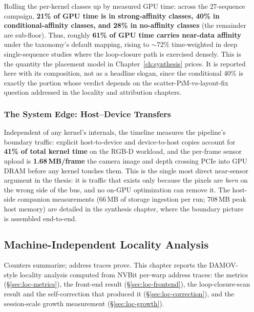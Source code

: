 Rolling the per-kernel classes up by measured GPU time: across the 27-sequence campaign, \textbf{21\% of GPU time is in strong-affinity classes, 40\% in conditional-affinity classes, and 28\% in no-affinity classes} (the remainder are sub-floor). Thus, roughly \textbf{61\% of GPU time carries near-data affinity} under the taxonomy's default mapping, rising to $\sim$72\% time-weighted in deep single-sequence studies where the loop-closure path is exercised densely. This is the quantity the placement model in Chapter~\ref{ch:synthesis} prices. It is reported here with its composition, not as a headline slogan, since the conditional 40\% is exactly the portion whose verdict depends on the scatter-PiM-vs-layout-fix question addressed in the locality and attribution chapters.

\subsubsection{The System Edge: Host--Device Transfers}
\label{sec:char-transfers}

Independent of any kernel's internals, the timeline measures the pipeline's boundary traffic: explicit host-to-device and device-to-host copies account for \textbf{41\% of total kernel time} on the RGB-D workload, and the per-frame sensor upload is \textbf{1.68\,MB/frame} the camera image and depth crossing PCIe into GPU DRAM before any kernel touches them. This is the single most direct near-sensor argument in the thesis: it is traffic that exists only because the pixels are \emph{born} on the wrong side of the bus, and no on-GPU optimization can remove it. The host-side companion measurements (66\,MB of storage ingestion per run; 708\,MB peak host memory) are detailed in the synthesis chapter, where the boundary picture is assembled end-to-end.

\subsection{Machine-Independent Locality Analysis}
\label{ch:locality}

Counters summarize; address traces prove. This chapter reports the DAMOV-style locality analysis computed from NVBit per-warp address traces: the metrics (\S\ref{sec:loc-metrics}), the front-end result (\S\ref{sec:loc-frontend}), the loop-closure-scan result and the self-correction that produced it (\S\ref{sec:loc-correction}), and the session-scale growth measurement (\S\ref{sec:loc-growth}).

